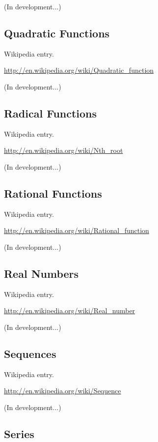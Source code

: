 \documentclass[12pt,oneside]{book}
\begin{document}
(In development...)

\subsection[Quadratic Functions]{Quadratic Functions}

Wikipedia entry.

\href{http://en.wikipedia.org/wiki/Quadratic_function}{http://en.wikipedia.org/wiki/Quadratic\_function}

(In development...)

\subsection[Radical Functions]{Radical Functions}

Wikipedia entry.

\href{http://en.wikipedia.org/wiki/Nth_root}{http://en.wikipedia.org/wiki/Nth\_root}

(In development...)

\subsection[Rational Functions]{Rational Functions}

Wikipedia entry.

\href{http://en.wikipedia.org/wiki/Rational_function}{http://en.wikipedia.org/wiki/Rational\_function}

(In development...)

\subsection[Real Numbers]{Real Numbers}

Wikipedia entry.

\href{http://en.wikipedia.org/wiki/Real_number}{http://en.wikipedia.org/wiki/Real\_number}

(In development...)

\subsection[Sequences]{Sequences}

Wikipedia entry.

\href{http://en.wikipedia.org/wiki/Sequence}{http://en.wikipedia.org/wiki/Sequence}

(In development...)

\subsection[Series]{Series}
\end{document}
